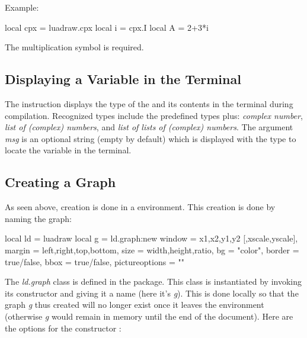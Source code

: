 Example:

\begin{Luacode}
local cpx = luadraw.cpx
local i = cpx.I
local A = 2+3*i
\end{Luacode}

The multiplication symbol is required.

\subsection{Displaying a Variable in the Terminal}

The instruction  displays the type of the  and its contents in the terminal during compilation. Recognized types include the predefined types plus: \emph{complex number}, \emph{list of (complex) numbers}, and \emph{list of lists of (complex) numbers}. The argument \emph{msg} is an optional string (empty by default) which is displayed with the type to locate the variable in the terminal.

\subsection{Creating a Graph}

As seen above, creation is done in a \luadrawenv environment. This creation is done by naming the graph:

\begin{Luacode}
local ld = luadraw
local g = ld.graph:new{ window = {x1,x2,y1,y2 [,xscale,yscale]}, margin = {left,right,top,bottom}, 
                     size = {width,height,ratio}, bg = "color", border = true/false, 
                     bbox = true/false, pictureoptions = "" }
\end{Luacode}

The \emph{ld.graph} class is defined in the \luadrawenv package. This class is instantiated by invoking its constructor and giving it a name (here it's \emph{g}). This is done locally so that the graph \emph{g} thus created will no longer exist once it leaves the environment (otherwise \emph{g} would remain in memory until the end of the document). Here are the options for the constructor :

